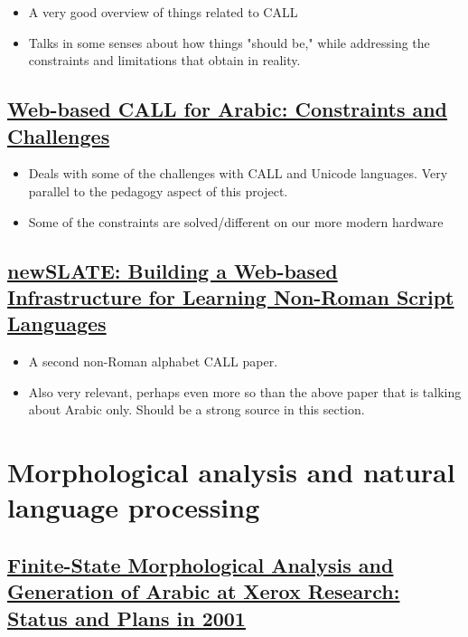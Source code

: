\documentclass[11pt]{article}
\begin{document}
\begin{itemize}
\item A very good overview of things related to CALL
\item Talks in some senses about how things "should be," while addressing the constraints and limitations that obtain in reality.
\end{itemize}

\subsection{\href{https://www.jstor.org/stable/24149791}{Web-based CALL for Arabic: Constraints and Challenges}}
\label{sec:orgc48aee6}

\begin{itemize}
\item Deals with some of the challenges with CALL and Unicode languages. Very parallel to the pedagogy aspect of this project.
\item Some of the constraints are solved/different on our more modern hardware
\end{itemize}


\subsection{\href{https://www.jstor.org/stable/24149794}{newSLATE: Building a Web-based Infrastructure for Learning Non-Roman Script Languages}}
\label{sec:orgee635b8}

\begin{itemize}
\item A second non-Roman alphabet CALL paper.
\item Also very relevant, perhaps even more so than the above paper that is talking about Arabic only. Should be a strong source in this section.
\end{itemize}

\section{Morphological analysis and natural language processing}
\label{sec:org0e08b4a}

\subsection{\href{http://www.europe.naverlabs.com/content/download/18525/133335/file/finite-state.pdf}{Finite-State Morphological Analysis and Generation of Arabic at Xerox Research: Status and Plans in 2001}}
\label{sec:orgf758b40}
\end{document}
